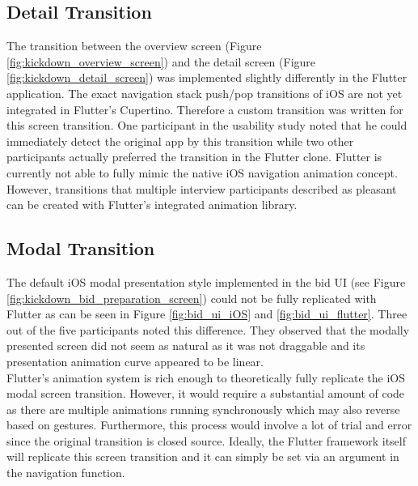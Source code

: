 \subsection{Detail Transition}
The transition between the overview screen (Figure \ref{fig:kickdown_overview_screen}) and the detail screen (Figure \ref{fig:kickdown_detail_screen}) was implemented slightly differently in the Flutter application.
The exact navigation stack push/pop transitions of iOS are not yet integrated in Flutter's Cupertino. Therefore a custom transition was written for this screen transition.
One participant in the usability study noted that he could immediately detect the original app by this transition while two other participants actually preferred the transition in the Flutter clone.
Flutter is currently not able to fully mimic the native iOS navigation animation concept. However, transitions that multiple interview participants described as pleasant can be created with Flutter's integrated animation library.

\subsection{Modal Transition}
The default iOS modal presentation style implemented in the bid UI (see Figure \ref{fig:kickdown_bid_preparation_screen}) could not be fully replicated with Flutter as can be seen in Figure \ref{fig:bid_ui_iOS} and \ref{fig:bid_ui_flutter}.
Three out of the five participants noted this difference. 
They observed that the modally presented screen did not seem as natural as it was not draggable and its presentation animation curve appeared to be linear.\\
Flutter's animation system is rich enough to theoretically fully replicate the iOS modal screen transition. However, it would require a substantial amount of code as there are multiple animations 
running synchronously which may also reverse based on gestures. Furthermore, this process would involve a lot of trial and error since the original transition is closed source.
Ideally, the Flutter framework itself will replicate this screen transition and it can simply be set via an argument in the navigation function.

